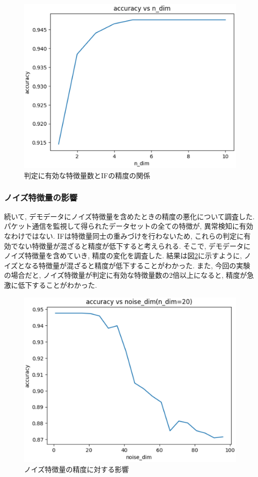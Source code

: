 \documentclass{css}
\begin{document}
\begin{figure}[ht]
    \centering
    \includegraphics[width=0.9\linewidth]{pictures/eps/dim_vs_accu.eps}
    \caption{判定に有効な特徴量数とIFの精度の関係}
    \label{fig:dim_vs_accu}
\end{figure}

\subsubsection{ノイズ特徴量の影響}
続いて, デモデータにノイズ特徴量を含めたときの精度の悪化について調査した. パケット通信を監視して得られたデータセットの全ての特徴が, 異常検知に有効なわけではない. IFは特徴量同士の重みづけを行わないため, これらの判定に有効でない特徴量が混ざると精度が低下すると考えられる. そこで, デモデータにノイズ特徴量を含めていき, 精度の変化を調査した. 結果は図\ref{fig:noise_accu}に示すように, ノイズとなる特徴量が混ざると精度が低下することがわかった. また, 今回の実験の場合だと, ノイズ特徴量が判定に有効な特徴量数の2倍以上になると, 精度が急激に低下することがわかった. 

\begin{figure}[ht]
    \centering
    \includegraphics[width=0.9\linewidth]{pictures/eps/noise_accu.eps}
    \caption{ノイズ特徴量の精度に対する影響}
    \label{fig:noise_accu}
\end{figure}
\end{document}

